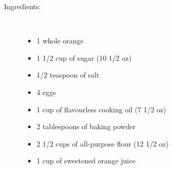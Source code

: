 \documentclass[11pt,letterpaper]{article}
\begin{document}
\begin{description}

\item[Ingredients:]\ \\
	\begin{itemize}
	\item 1 whole orange
	\item 1 1/2 cup of sugar (10 1/2 oz)
	\item 1/2 teaspoon of salt
	\item 4 eggs
	\item 1 cup of flavourless cooking oil (7 1/2 oz)
	\item 2 tablespoons of baking powder
	\item 2 1/2 cups of all-purpose flour (12 1/2 oz)
	\item 1 cup of sweetened orange juice
	\end{itemize}


\end{description}
\end{document}
